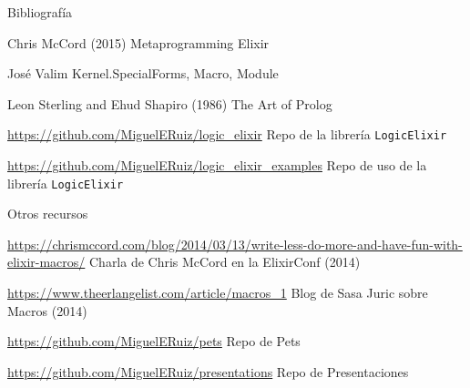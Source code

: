 \documentclass[14pt,aspectratio=169]{beamer}
\begin{document}
\begin{frame}{Bibliografía}
  \begin{thebibliography}{99} %
     Chris McCord (2015)
    \newblock Metaprogramming Elixir
  \end{thebibliography}
  \begin{thebibliography}{99} %
     José Valim
    \newblock Kernel.SpecialForms, Macro, Module
  \end{thebibliography}
  \begin{thebibliography}{99}
     Leon Sterling and Ehud Shapiro (1986)
    \newblock The Art of Prolog
  \end{thebibliography}
  \begin{thebibliography}{99}
     \url{https://github.com/MiguelERuiz/logic\_elixir}
    \newblock Repo de la librería \texttt{LogicElixir}
  \end{thebibliography}
  \begin{thebibliography}{99}
     \url{https://github.com/MiguelERuiz/logic\_elixir\_examples}
    \newblock Repo de uso de la librería \texttt{LogicElixir}
  \end{thebibliography}
\end{frame}

\begin{frame}{Otros recursos}
  \begin{thebibliography}{99}
       \url{https://chrismccord.com/blog/2014/03/13/write-less-do-more-and-have-fun-with-elixir-macros/}
      \newblock Charla de Chris McCord en la ElixirConf (2014)
  \end{thebibliography}
  \begin{thebibliography}{99}
       \url{https://www.theerlangelist.com/article/macros_1}
      \newblock Blog de Sasa Juric sobre Macros (2014)
  \end{thebibliography}
  \begin{thebibliography}{99}
       \url{https://github.com/MiguelERuiz/pets}
      \newblock Repo de Pets
  \end{thebibliography}
  \begin{thebibliography}{99}
       \url{https://github.com/MiguelERuiz/presentations}
      \newblock Repo de Presentaciones
  \end{thebibliography}
\end{frame}
\end{document}
